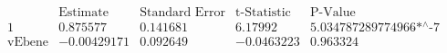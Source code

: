 \[\begin{array}{l|llll}
 \text{} & \text{Estimate} & \text{Standard Error} & \text{t-Statistic} & \text{P-Value} \\
\hline
 1 & 0.875577 & 0.141681 & 6.17992 & \text{5.034787289774966$\grave{ }$*${}^{\wedge}$-7} \\
 \text{vEbene} & -0.00429171 & 0.092649 & -0.0463223 & 0.963324 \\
\end{array}\]

